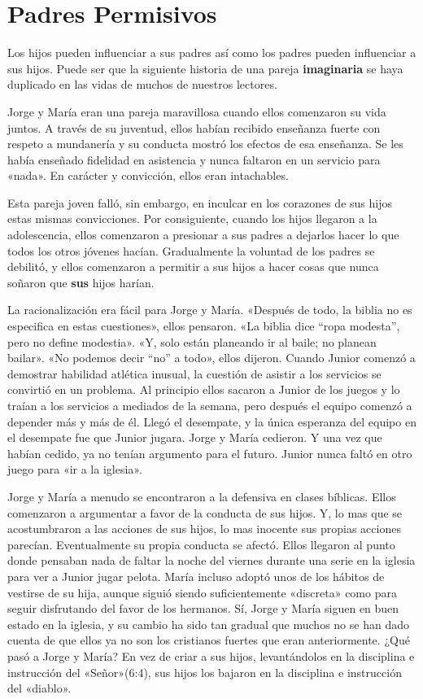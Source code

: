 \documentclass[12pt, twoside, openright]{book}
\begin{document}
\section{Padres Permisivos}
Los hijos pueden influenciar a sus padres así como los padres pueden influenciar a sus hijos. Puede ser que la siguiente historia de una pareja \textbf{imaginaria} se haya duplicado en las vidas de muchos de nuestros lectores. 

Jorge y María eran una pareja maravillosa cuando ellos comenzaron su vida juntos. A través de su juventud, ellos habían recibido enseñanza fuerte con respeto a mundanería y su conducta mostró los efectos de esa enseñanza. Se les había enseñado fidelidad en asistencia y nunca faltaron en un servicio para «nada». En carácter y convicción, ellos eran intachables. 

Esta pareja joven falló, sin embargo, en inculcar en los corazones de sus hijos estas mismas convicciones. Por consiguiente, cuando los hijos llegaron a la adolescencia, ellos comenzaron a presionar a sus padres a dejarlos hacer lo que todos los otros jóvenes hacían. Gradualmente la voluntad de los padres se debilitó, y ellos comenzaron a permitir a sus hijos a hacer cosas que nunca soñaron que \textbf{sus} hijos harían.

La racionalización era fácil para Jorge y María. «Después de todo, la biblia no es especifica en estas cuestiones», ellos pensaron. «La biblia dice “ropa modesta”, pero no define modestia». «Y, solo están planeando ir al baile; no planean bailar». «No podemos decir “no” a todo», ellos dijeron. Cuando Junior comenzó a demostrar habilidad atlética inusual, la cuestión de asistir a los servicios se convirtió en un problema. Al principio ellos sacaron a Junior de los juegos y lo traían a los servicios a mediados de la semana, pero después el equipo comenzó a depender más y más de él. Llegó el desempate, y la única esperanza del equipo en el desempate fue que Junior jugara. Jorge y María cedieron. Y una vez que habían cedido, ya no tenían argumento para el futuro. Junior nunca faltó en otro juego para «ir a la iglesia».

Jorge y María a menudo se encontraron a la defensiva en clases bíblicas. Ellos comenzaron a argumentar a favor de la conducta de sus hijos. Y, lo mas que se acostumbraron a las acciones de sus hijos, lo mas inocente sus propias acciones parecían. Eventualmente su propia conducta se afectó. Ellos llegaron al punto donde pensaban nada de faltar la noche del viernes durante una serie en la iglesia para ver a Junior jugar pelota. María incluso adoptó unos de los hábitos de vestirse de su hija, aunque siguió siendo suficientemente «discreta» como para seguir disfrutando del favor de los hermanos. Sí, Jorge y María siguen en buen estado en la iglesia, y su cambio ha sido tan gradual que muchos no se han dado cuenta de que ellos ya no son los cristianos fuertes que eran anteriormente. ¿Qué pasó a Jorge y María? En vez de criar a sus hijos, levantándolos en la disciplina e instrucción del «Señor»(6:4), sus hijos los bajaron en la disciplina e instrucción del «diablo».
\end{document}
